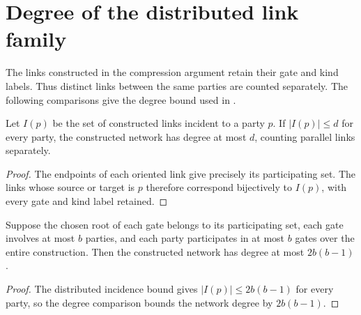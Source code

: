 \section{Degree of the distributed link family}
\label{sec:peps_distributed_routing_degree}

The links constructed in the compression argument retain their gate and kind
labels. Thus distinct links between the same parties are counted separately.
The following comparisons give the degree bound used in
\cite[Section~8.1]{OpenAI2026PolynomialPEPS}.

\begin{lemma}
    \label{thm:peps_distributed_degree_incidence}
    \leanok
    Let $I(p)$ be the set of constructed links incident to a party $p$.
    If $|I(p)|\le d$ for every party, the constructed network has degree at
    most $d$, counting parallel links separately.
\end{lemma}
\begin{proof}\leanok
    The endpoints of each oriented link give precisely its participating
    set. The links whose source or target is $p$ therefore correspond
    bijectively to $I(p)$, with every gate and kind label retained.
\end{proof}

\begin{lemma}
    \label{thm:peps_distributed_degree_lifetime}
    \leanok
    Suppose the chosen root of each gate belongs to its participating set,
    each gate involves at most $b$ parties, and each party participates in
    at most $b$ gates over the entire construction. Then the constructed
    network has degree at most $2b(b-1)$.
\end{lemma}
\begin{proof}\leanok
    The distributed incidence bound gives $|I(p)|\le2b(b-1)$ for every
    party, so the degree comparison bounds the network degree by $2b(b-1)$.
\end{proof}
